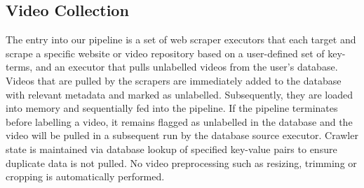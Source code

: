 \documentclass[letterpaper, 10 pt, conference]{IEEEconf}
\begin{document}

\subsection{Video Collection}


The entry into our pipeline is a set of web scraper executors that each target and scrape a specific website or video repository based on a user-defined set of key-terms, and an executor that pulls unlabelled videos from the user's database. Videos that are pulled by the scrapers are immediately added to the database with relevant metadata and marked as unlabelled. Subsequently, they are loaded into memory and sequentially fed into the pipeline. If the pipeline terminates before labelling a video, it remains flagged as unlabelled in the database and the video will be pulled in a subsequent run by the database source executor. Crawler state is maintained via database lookup of specified key-value pairs to ensure duplicate data is not pulled. No video preprocessing such as resizing, trimming or cropping is automatically performed.
\end{document}
